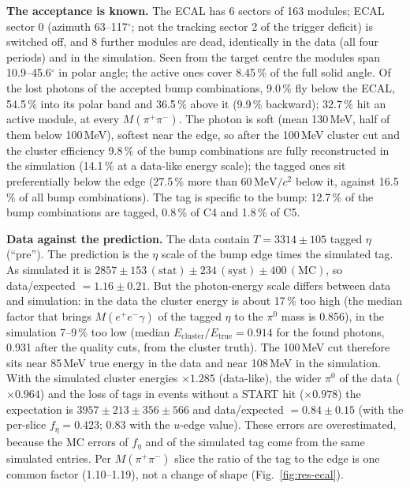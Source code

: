 \documentclass[11pt,a4paper]{article}
\newcommand{\piz}{\ensuremath{\pi^{0}}\xspace}
\newcommand{\ee}{\ensuremath{e^{+}e^{-}}\xspace}
\newcommand{\Mpipi}{\ensuremath{M(\pi^{+}\pi^{-})}\xspace}
\newcommand{\MeVcc}{\ensuremath{\mathrm{MeV}/c^{2}}\xspace}
\begin{document}
\textbf{The acceptance is known.} The ECAL has 6 sectors of 163 modules; ECAL sector 0 (azimuth 63--117$^\circ$; not the tracking sector 2 of
the trigger deficit) is switched off, and 8 further modules are dead, identically in the data (all four periods) and in the simulation. Seen
from the target centre the modules span 10.9--45.6$^\circ$ in polar angle; the active ones cover 8.45\,\% of the full solid angle. Of the lost
photons of the accepted bump combinations, 9.0\,\% fly below the ECAL, 54.5\,\% into its polar band and 36.5\,\% above it (9.9\,\% backward); 32.7\,\% hit
an active module, at every \Mpipi. The photon is soft (mean 130\,MeV, half of them below 100\,MeV), softest near the edge, so after the
100\,MeV cluster cut and the cluster efficiency 9.8\,\% of the bump combinations are fully reconstructed in the simulation (14.1\,\% at a data-like
energy scale); the tagged ones sit preferentially below the edge (27.5\,\% more than 60\,\MeVcc below it, against 16.5\,\% of all bump
combinations). The tag is specific to the bump: 12.7\,\% of the bump combinations are tagged, 0.8\,\% of C4 and 1.8\,\% of C5.

\textbf{Data against the prediction.} The data contain $T=3314\pm105$ tagged $\eta$ (``pre''). The prediction is the $\eta$ scale of the bump
edge times the simulated tag. As simulated it is $2857\pm153\,(\mathrm{stat})\pm234\,(\mathrm{syst})\pm400\,(\mathrm{MC})$, so data/expected
$=1.16\pm0.21$. But the photon-energy scale differs between data and simulation: in the data the cluster energy is about 17\,\% too high (the
median factor that brings $M(\ee\gamma)$ of the tagged $\eta$ to the \piz mass is 0.856), in the simulation 7--9\,\% too low (median
$E_{\mathrm{cluster}}/E_{\mathrm{true}}=0.914$ for the found photons, 0.931 after the quality cuts, from the cluster truth). The 100\,MeV cut
therefore sits near 85\,MeV true energy in the data and near 108\,MeV in the simulation. With the simulated cluster energies $\times1.285$
(data-like), the wider \piz of the data ($\times0.964$) and the loss of tags in events without a START hit ($\times0.978$) the expectation is
$3957\pm213\pm356\pm566$ and data/expected $=0.84\pm0.15$ (with the per-slice $f_\eta=0.423$; 0.83 with the $u$-edge value). These errors
are overestimated, because the MC errors of $f_\eta$ and of the simulated tag come from the same simulated entries. Per \Mpipi slice the ratio of the tag to the edge is one common factor (1.10--1.19), not a change of shape
(Fig.~\ref{fig:res-ecal}).
\end{document}
